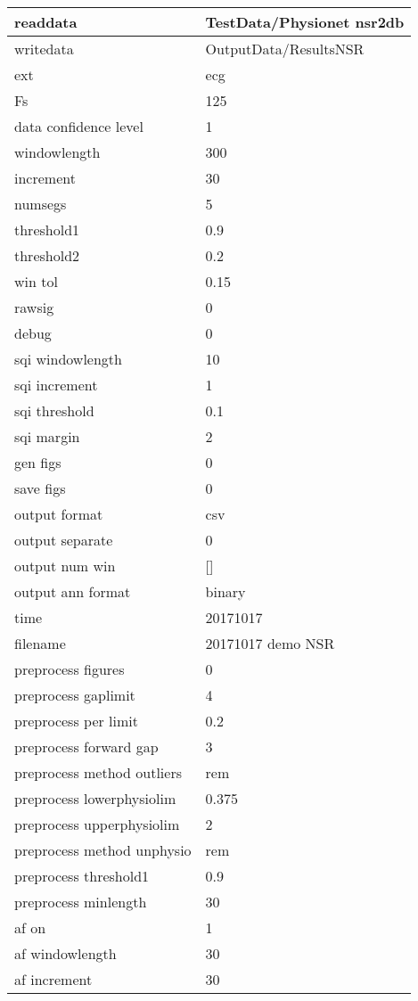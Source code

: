 \begin{tabular}{|l|l|}
\hline
readdata&TestData/Physionet nsr2db\\\hline
writedata&OutputData/ResultsNSR\\\hline
ext&ecg\\\hline
Fs&125\\\hline
data confidence level&1\\\hline
windowlength&300\\\hline
increment&30\\\hline
numsegs&5\\\hline
threshold1&0.9\\\hline
threshold2&0.2\\\hline
win tol&0.15\\\hline
rawsig&0\\\hline
debug&0\\\hline
sqi windowlength&10\\\hline
sqi increment&1\\\hline
sqi threshold&0.1\\\hline
sqi margin&2\\\hline
gen figs&0\\\hline
save figs&0\\\hline
output format&csv\\\hline
output separate&0\\\hline
output num win&[]\\\hline
output ann format&binary\\\hline
time&20171017\\\hline
filename&20171017 demo NSR\\\hline
preprocess figures&0\\\hline
preprocess gaplimit&4\\\hline
preprocess per limit&0.2\\\hline
preprocess forward gap&3\\\hline
preprocess method outliers&rem\\\hline
preprocess lowerphysiolim&0.375\\\hline
preprocess upperphysiolim&2\\\hline
preprocess method unphysio&rem\\\hline
preprocess threshold1&0.9\\\hline
preprocess minlength&30\\\hline
af on&1\\\hline
af windowlength&30\\\hline
af increment&30\\\hline

\end{tabular}

